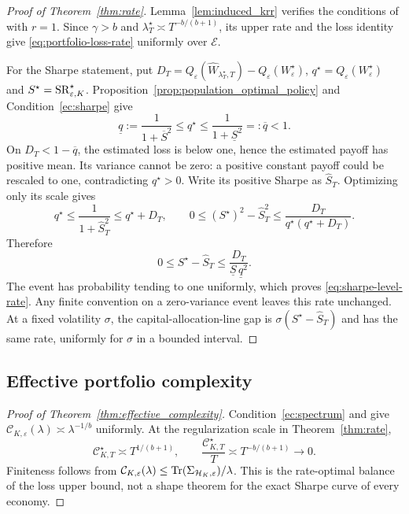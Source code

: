 \begin{proof}[Proof of Theorem~\ref{thm:rate}]
Lemma~\ref{lem:induced_krr} verifies the conditions of
\citet[Lemma~A.7]{bignozzigagliardinischneider2026} with $r=1$.
Since $\gamma>b$ and $\lambda_T^\star\asymp T^{-b/(b+1)}$, its upper
rate and the loss identity give \eqref{eq:portfolio-loss-rate} uniformly
over $\mathcal E$.

For the Sharpe statement, put
$D_T=Q_\varepsilon(\widehat W_{\lambda_T^\star,T})-Q_\varepsilon(W^\star_\varepsilon)$,
$q^\star=Q_\varepsilon(W^\star_\varepsilon)$ and
$S^\star=\operatorname{SR}^\star_{\varepsilon,K}$.
Proposition~\ref{prop:population_optimal_policy} and
Condition~\ref{ec:sharpe} give
\[
\underline q:=\frac1{1+\overline S^2}
\leq q^\star\leq\frac1{1+\underline S^2}=: \overline q<1.
\]
On $D_T<1-\overline q$, the estimated loss is below one, hence the
estimated payoff has positive mean. Its variance cannot be zero:
a positive constant payoff could be rescaled to one, contradicting
$q^\star>0$. Write its positive Sharpe as $\widehat S_T$.
Optimizing only its scale gives
\[
q^\star\leq\frac1{1+\widehat S_T^2}\leq q^\star+D_T,
\qquad
0\leq(S^\star)^2-\widehat S_T^2
\leq\frac{D_T}{q^\star(q^\star+D_T)}.
\]
Therefore
\[
0\leq S^\star-\widehat S_T
\leq\frac{D_T}{\underline S\,\underline q^2}.
\]
The event has probability tending to one uniformly, which proves
\eqref{eq:sharpe-level-rate}. Any finite convention on a zero-variance
event leaves this rate unchanged. At a fixed volatility $\sigma$, the
capital-allocation-line gap is $\sigma(S^\star-\widehat S_T)$ and has
the same rate, uniformly for $\sigma$ in a bounded interval.
\end{proof}

\subsection{Effective portfolio complexity}
\label{app:complexity}

\begin{proof}[Proof of Theorem~\ref{thm:effective_complexity}]
Condition~\ref{ec:spectrum} and
\citet[Proposition~A.6]{bignozzigagliardinischneider2026} give
$\mathcal C_{K,\varepsilon}(\lambda)\asymp\lambda^{-1/b}$ uniformly.
At the regularization scale in Theorem~\ref{thm:rate},
\[
\mathcal C^\star_{K,T}\asymp T^{1/(b+1)},
\qquad
\frac{\mathcal C^\star_{K,T}}{T}\asymp T^{-b/(b+1)}\longrightarrow0.
\]
Finiteness follows from
$\mathcal C_{K,\varepsilon}(\lambda)\leq\operatorname{Tr}(\Sigma_{\mathcal{H}_K,\varepsilon})/\lambda$.
This is the rate-optimal balance of the loss upper bound, not a shape
theorem for the exact Sharpe curve of every economy.
\end{proof}


